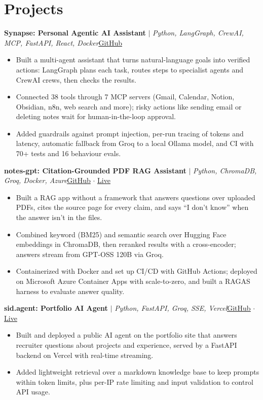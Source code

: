 \documentclass[10pt,a4paper]{article}
\newcommand{\project}[3]{%
  \textbf{#1} $|$ \textit{#2}\hfill #3\par}
\newcommand{\link}[2]{\href{#1}{\color{accent}\underline{#2}}}
\begin{document}
\section{Projects}
\project{Synapse: Personal Agentic AI Assistant}{Python, LangGraph, CrewAI, MCP, FastAPI, React, Docker}{\link{https://github.com/Siddhu-6/Synapse}{GitHub}}
\begin{itemize}
  \item Built a multi-agent assistant that turns natural-language goals into verified actions: LangGraph plans each task, routes steps to specialist agents and CrewAI crews, then checks the results.
  \item Connected 38 tools through 7 MCP servers (Gmail, Calendar, Notion, Obsidian, n8n, web search and more); risky actions like sending email or deleting notes wait for human-in-the-loop approval.
  \item Added guardrails against prompt injection, per-run tracing of tokens and latency, automatic fallback from Groq to a local Ollama model, and CI with 70+ tests and 16 behaviour evals.
\end{itemize}
\vspace{2pt}
\project{notes-gpt: Citation-Grounded PDF RAG Assistant}{Python, ChromaDB, Groq, Docker, Azure}{\link{https://github.com/Siddhu-6/notes-gpt}{GitHub} $\cdot$ \link{https://notes-gpt.wittyflower-e8ca6384.centralindia.azurecontainerapps.io/}{Live}}
\begin{itemize}
  \item Built a RAG app without a framework that answers questions over uploaded PDFs, cites the source page for every claim, and says ``I don't know'' when the answer isn't in the files.
  \item Combined keyword (BM25) and semantic search over Hugging Face embeddings in ChromaDB, then reranked results with a cross-encoder; answers stream from GPT-OSS 120B via Groq.
  \item Containerized with Docker and set up CI/CD with GitHub Actions; deployed on Microsoft Azure Container Apps with scale-to-zero, and built a RAGAS harness to evaluate answer quality.
\end{itemize}
\vspace{2pt}
\project{sid.agent: Portfolio AI Agent}{Python, FastAPI, Groq, SSE, Vercel}{\link{https://github.com/Siddhu-6/sid-gavit-portfolio}{GitHub} $\cdot$ \link{https://sid-gavit-portfolio.vercel.app/\#agent}{Live}}
\begin{itemize}
  \item Built and deployed a public AI agent on the portfolio site that answers recruiter questions about projects and experience, served by a FastAPI backend on Vercel with real-time streaming.
  \item Added lightweight retrieval over a markdown knowledge base to keep prompts within token limits, plus per-IP rate limiting and input validation to control API usage.
\end{itemize}
\end{document}
